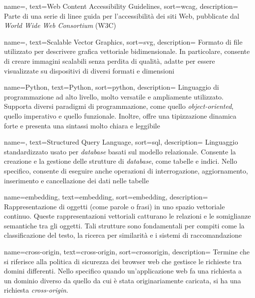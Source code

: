  {
    name=,
    text=Web Content Accessibility Guidelines,
    sort=wcag,
    description=
    {Parte di una serie di linee guida per l'accessibilità dei siti Web, pubblicate dal \emph{World Wide Web Consortium} (W3C)}
}

 {
    name=,
    text=Scalable Vector Graphics,
    sort=svg,
    description=
        {Formato di file utilizzato per descrivere grafica vettoriale bidimensionale. 
        In particolare, consente di creare immagini scalabili senza perdita di qualità, adatte per essere visualizzate su 
        dispositivi di diversi formati e dimensioni}
}

 {
    name=Python,
    text=Python,
    sort=python,
    description=
    {Linguaggio di programmazione ad alto livello, molto versatile e ampliamente utilizzato.
    Supporta diversi paradigmi di programmazione, come quello \emph{object-oriented}, quello imperativo e quello funzionale.
    Inoltre, offre una tipizzazione dinamica forte e presenta una sintassi molto chiara e leggibile}
}

 {
    name=,
    text=Structured Query Language,
    sort=sql,
    description=
    {Linguaggio standardizzato usato per \emph{database} basati sul modello relazionale.
    Consente la creazione e la gestione delle strutture di \emph{database}, come tabelle e indici. Nello specifico, consente di eseguire anche operazioni di 
    interrogazione, aggiornamento, inserimento e cancellazione dei dati nelle tabelle}
}

 {
    name=embedding,
    text=embedding,
    sort=embedding,
    description=
    {Rappresentazione di oggetti (come parole o frasi) in uno spazio vettoriale continuo. Queste rappresentazioni vettoriali catturano le relazioni e le somiglianze semantiche tra gli oggetti.
    Tali strutture sono fondamentali per compiti come la classificazione del testo, la ricerca per similarità e i sistemi di raccomandazione}
}

 {
    name=cross-origin,
    text=cross-origin,
    sort=crossorigin,
    description=
    {Termine che si riferisce alla politica di sicurezza dei browser web che gestisce le richieste tra domini differenti. 
    Nello specifico quando un'applicazione web fa una richiesta a un dominio diverso da quello da cui è stata originariamente caricata, si ha una richiesta \emph{cross-origin}.}
}


